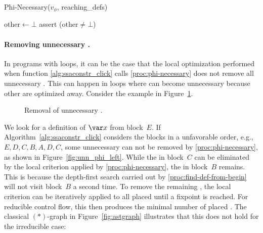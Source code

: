 {\begin{procedure}
  \caption{Phi-Necessary($v_\phi$, reaching\_defs)}
  \label{proc:phi-necessary}
  $\textrm{other} \gets \bot$\;
  assert ($\textrm{other} \ne \bot$)\;
\end{procedure}

\paragraph{Removing unnecessary \phifuns.}

In programs with loops, it can be the case that the local optimization performed when function \ref{alg:ssaconstr_click} calls \ref{proc:phi-necessary} does not remove all unnecessary \phifuns. 
This can happen in loops where \phifuns can become unnecessary because other \phifuns are optimized away. 
Consider the example in Figure~\ref{fig:phiopt}.
\begin{figure}[htbp]
	\begin{center}
		\qquad
	\end{center}
	\caption{Removal of unnecessary \phifuns.}
	\label{fig:phiopt}
\end{figure}
We look for a definition of $\var x$ from block~$E$.
If Algorithm~\ref{alg:ssaconstr_click} considers the blocks in a unfavorable order, e.g., $E,D,C,B,A,D,C$, some unnecessary \phifuns can not be removed by \ref{proc:phi-necessary}, as shown in Figure~\ref{fig:unn_phi_left}.
While the \phifun in block~$C$ can be eliminated by the local criterion applied by \ref{proc:phi-necessary}, the \phifun in block~$B$ remains. 
This is because the depth-first search carried out by \ref{proc:find-def-from-begin} will not visit block~$B$ a second time.
To remove the remaining \phifuns, the local criterion can be iteratively applied to all placed \phifuns until a fixpoint is reached. 
For reducible control flow, this then produces the minimal number of placed \phifuns. 
The classical $(\ast)$-graph in Figure~\ref{fig:astgraph} illustrates that this does not hold for the irreducible case:

}
